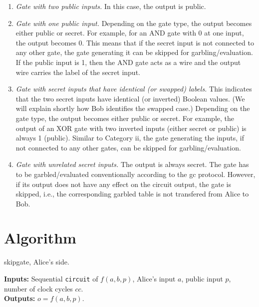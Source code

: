 \begin{enumerate}[label=\roman*]
  \item \textit{Gate with two public inputs.}
    In this case, the output is public.
  \item \textit{Gate with one public input.}
  	Depending on the gate type, the output becomes either public or secret.
  	For example, for an AND gate with 0 at one input, the output becomes 0.
  	This means that if the secret input is not connected to any other gate, the gate generating it can be skipped for garbling/evaluation.
  	If the public input is 1, then the AND gate acts as a wire and the output wire carries the label of the secret input.
  \item \textit{Gate with secret inputs that have identical (or swapped) labels.}
    This indicates that the two secret inputs have identical (or inverted) Boolean values.
    (We will explain shortly how Bob identifies the swapped case.)
    Depending on the gate type, the output becomes either public or secret.
    For example, the output of an XOR gate with two inverted inputs (either secret or public) is always 1 (public).
  	Similar to Category ii, the gate generating the inputs, if not connected to any other gates, can be skipped for garbling/evaluation.
  \item \textit{Gate with unrelated secret inputs.}
  	The output is always secret.
  	The gate has to be garbled/evaluated conventionally according to the \acrshort{gc} protocol.
    However, if its output does not have any effect on the circuit output, the gate is skipped, i.e., the corresponding garbled table is not transfered from Alice to Bob.
\end{enumerate}

\section{Algorithm}\label{sec:skipgate-alg}

\begin{algorithm}
\caption{\gls{skipgate}, Alice's side.}\label{alg:alice}
\textbf{Inputs:} Sequential \texttt{circuit} of $f(a,b,p)$, Alice's input $a$, public input $p$, number of clock cycles $cc$.\\
\textbf{Outputs:} $o = f(a,b,p)$.\\
\begin{algorithmic}[1]
\ENDFOR
{}
\end{algorithmic}
\end{algorithm}

